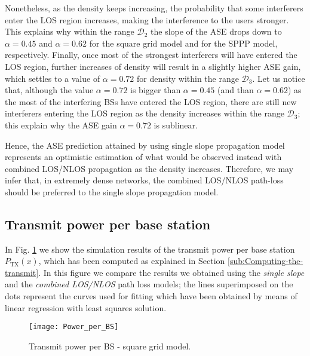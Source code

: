 \documentclass[twocoumn]{IEEEtran}
\begin{document}
Nonetheless, as the density keeps increasing, the probability that some interferers enter the LOS region increases, making the interference to the users stronger. This explains why within the range $\mathcal{D}_{\mathrm{2}}$ the slope of the ASE drops down to $\alpha=0.45$ and $\alpha=0.62$ for the square grid model and for the SPPP model, respectively. Finally, once most of the strongest interferers will have entered the LOS region, further increases of density will result in a slightly higher ASE gain, which settles to a value of $\alpha=0.72$ for density within the range $\mathcal{D}_{\mathrm{3}}$. Let us notice that, although the value $\alpha=0.72$ is bigger than $\alpha=0.45$ (and than $\alpha=0.62$) as the most of the interfering BSs have entered the LOS region, there are still new interferers entering the LOS region as the density increases within the range $\mathcal{D}_{\mathrm{3}}$; this explain why the ASE gain $\alpha=0.72$ is sublinear.

Hence, the ASE prediction attained by using single slope propagation
model represents an optimistic estimation of what would be observed
instead with combined LOS/NLOS propagation as the density increases. Therefore, we may infer that, in extremely dense networks, the combined LOS/NLOS path-loss should be preferred to the single slope propagation model.


\subsection{Transmit power per base station}\label{sub:TXPowerPerBS}

In Fig. \ref{fig:transmit_power} we show the simulation results of
the transmit power per base station $P_{\mathrm{TX}}(x)$, which has been computed as explained in Section
\ref{sub:Computing-the-transmit}. In this figure we compare the results
we obtained using the \textit{single slope} and the \textit{combined LOS/NLOS}
path loss models; the lines superimposed on the dots represent the
curves used for fitting which have been obtained by means
of linear regression with least squares solution.

\begin{figure}
\centering
\texttt{[image: Power\_per\_BS]}
\caption{Transmit power per BS - square grid model.}\label{fig:transmit_power}
\vspace{-4mm}
\end{figure}
\end{document}
